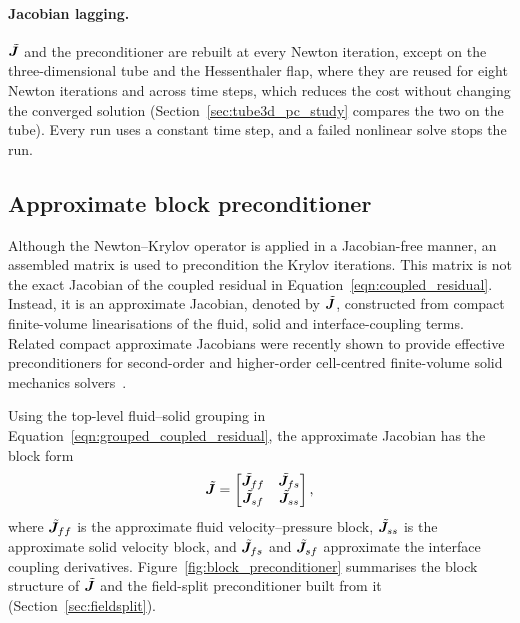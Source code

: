 \paragraph{Jacobian lagging.}
$\tilde{\boldsymbol{J}}$ and the preconditioner are rebuilt at every Newton iteration, except on the three-dimensional tube and the Hessenthaler flap, where they are reused for eight Newton iterations and across time steps, which reduces the cost without changing the converged solution (Section~\ref{sec:tube3d_pc_study} compares the two on the tube).
Every run uses a constant time step, and a failed nonlinear solve stops the run.


\subsection{Approximate block preconditioner}
\label{sec:approximate_block_preconditioner}

Although the Newton--Krylov operator is applied in a Jacobian-free manner, an
assembled matrix is used to precondition the Krylov iterations. This matrix is
not the exact Jacobian of the coupled residual in
Equation~\eqref{eqn:coupled_residual}. Instead, it is an approximate Jacobian,
denoted by $\tilde{\boldsymbol{J}}$, constructed from compact finite-volume
linearisations of the fluid, solid and interface-coupling terms. Related
compact approximate Jacobians were recently shown to provide effective
preconditioners for second-order and higher-order cell-centred finite-volume
solid mechanics solvers~\citep{Cardiff2026, Batistic2026}.

Using the top-level fluid--solid grouping in Equation~\eqref{eqn:grouped_coupled_residual}, the approximate Jacobian has the
block form
\begin{equation}
    \tilde{\boldsymbol{J}}
    =
    \begin{bmatrix}
    \tilde{\boldsymbol{J}}_{ff} & \tilde{\boldsymbol{J}}_{fs} \\
    \tilde{\boldsymbol{J}}_{sf} & \tilde{\boldsymbol{J}}_{ss}
    \end{bmatrix},
    \label{eqn:block_preconditioner}
\end{equation}
where $\tilde{\boldsymbol{J}}_{ff}$ is the approximate fluid velocity--pressure block,
$\tilde{\boldsymbol{J}}_{ss}$ is the approximate solid velocity block, and
$\tilde{\boldsymbol{J}}_{fs}$ and $\tilde{\boldsymbol{J}}_{sf}$ approximate the interface
coupling derivatives.
Figure~\ref{fig:block_preconditioner} summarises the block structure of $\tilde{\boldsymbol{J}}$ and the field-split preconditioner built from it (Section~\ref{sec:fieldsplit}).


